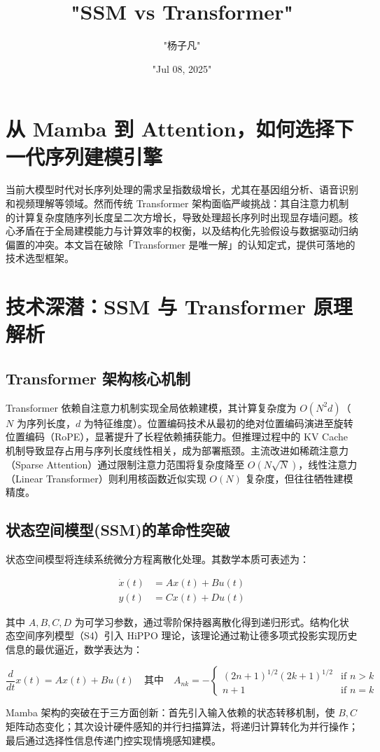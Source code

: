\title{"SSM vs Transformer"}
\author{"杨子凡"}
\date{"Jul 08, 2025"}
\maketitle
\chapter{从 Mamba 到 Attention，如何选择下一代序列建模引擎}
当前大模型时代对长序列处理的需求呈指数级增长，尤其在基因组分析、语音识别和视频理解等领域。然而传统 Transformer 架构面临严峻挑战：其自注意力机制的计算复杂度随序列长度呈二次方增长，导致处理超长序列时出现显存墙问题。核心矛盾在于全局建模能力与计算效率的权衡，以及结构化先验假设与数据驱动归纳偏置的冲突。本文旨在破除「Transformer 是唯一解」的认知定式，提供可落地的技术选型框架。\par
\chapter{技术深潜：SSM 与 Transformer 原理解析}
\section{Transformer 架构核心机制}
Transformer 依赖自注意力机制实现全局依赖建模，其计算复杂度为 $O(N^2d)$（$N$ 为序列长度，$d$ 为特征维度）。位置编码技术从最初的绝对位置编码演进至旋转位置编码（RoPE），显著提升了长程依赖捕获能力。但推理过程中的 KV Cache 机制导致显存占用与序列长度线性相关，成为部署瓶颈。主流改进如稀疏注意力（Sparse Attention）通过限制注意力范围将复杂度降至 $O(N\sqrt{N})$，线性注意力（Linear Transformer）则利用核函数近似实现 $O(N)$ 复杂度，但往往牺牲建模精度。\par
\section{状态空间模型(SSM)的革命性突破}
状态空间模型将连续系统微分方程离散化处理。其数学本质可表述为：\par
$$ \begin{aligned} \dot{x}(t) &= Ax(t) + Bu(t) \\ y(t) &= Cx(t) + Du(t) \end{aligned} $$\par
其中 $A, B, C, D$ 为可学习参数，通过零阶保持器离散化得到递归形式。结构化状态空间序列模型（S4）引入 HiPPO 理论，该理论通过勒让德多项式投影实现历史信息的最优逼近，数学表达为：\par
$$ \frac{d}{dt}x(t) = Ax(t) + Bu(t) \quad \text{其中} \quad A_{nk} = -\begin{cases} (2n+1)^{1/2}(2k+1)^{1/2} & \text{if } n>k \\ n+1 & \text{if } n=k \end{cases} $$\par
Mamba 架构的突破在于三方面创新：首先引入输入依赖的状态转移机制，使 $B, C$ 矩阵动态变化；其次设计硬件感知的并行扫描算法，将递归计算转化为并行操作；最后通过选择性信息传递门控实现情境感知建模。\par
